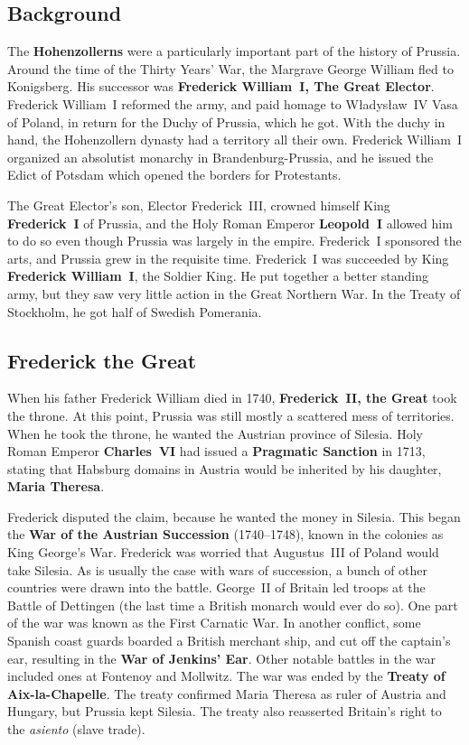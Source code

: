 \subsection*{Background}

The \textbf{Hohenzollerns} were a particularly important part of the history of Prussia.
Around the time of the Thirty Years' War, the Margrave George William fled to Konigsberg.
His successor was \textbf{Frederick William~I, The Great Elector}.
Frederick William~I reformed the army, and paid homage to W\l{}adys\l{}aw~IV Vasa of Poland,
in return for the Duchy of Prussia, which he got.
With the duchy in hand, the Hohenzollern dynasty had a territory all their own.
Frederick William~I organized an absolutist monarchy in Brandenburg-Prussia,
and he issued the Edict of Potsdam which opened the borders for Protestants.

The Great Elector's son, Elector Frederick~III, crowned himself King \textbf{Frederick~I} of Prussia,
and the Holy Roman Emperor \textbf{Leopold~I} allowed him to do so even though Prussia was largely in the empire.
Frederick~I sponsored the arts, and Prussia grew in the requisite time.
Frederick~I was succeeded by King \textbf{Frederick William~I}, the Soldier King.
He put together a better standing army, but they saw very little action in the Great Northern War.
In the Treaty of Stockholm, he got half of Swedish Pomerania.

\subsection*{Frederick the Great}

When his father Frederick William died in 1740, \textbf{Frederick~II, the Great} took the throne.
At this point, Prussia was still mostly a scattered mess of territories.
When he took the throne, he wanted the Austrian province of Silesia.
Holy Roman Emperor \textbf{Charles~VI} had issued a \textbf{Pragmatic Sanction} in 1713,
stating that Habsburg domains in Austria would be inherited by his daughter, \textbf{Maria Theresa}.

Frederick disputed the claim, because he wanted the money in Silesia.
This began the \textbf{War of the Austrian Succession} (1740--1748),
known in the colonies as King George's War.
Frederick was worried that Augustus~III of Poland would take Silesia.
As is usually the case with wars of succession, a bunch of other countries were drawn into the battle.
George~II of Britain led troops at the Battle of Dettingen (the last time a British monarch would ever do so).
One part of the war was known as the First Carnatic War.
In another conflict, some Spanish coast guards boarded a British merchant ship,
and cut off the captain's ear, resulting in the \textbf{War of Jenkins' Ear}.
Other notable battles in the war included ones at Fontenoy and Mollwitz.
The war was ended by the \textbf{Treaty of Aix-la-Chapelle}.
The treaty confirmed Maria Theresa as ruler of Austria and Hungary, but Prussia kept Silesia.
The treaty also reasserted Britain's right to the \textit{asiento} (slave trade).

